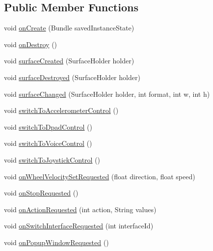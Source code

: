 \subsection*{Public Member Functions}
\begin{DoxyCompactItemize}
\item 
void \hyperlink{classcom_1_1cellbots_1_1directcontrol_1_1_cellbot_pet_activity_aa495c9cab7b25b9bc4ed212560003e57}{on\-Create} (Bundle saved\-Instance\-State)
\item 
void \hyperlink{classcom_1_1cellbots_1_1directcontrol_1_1_cellbot_pet_activity_aae26caa6558899d648deeeaeac2e83e2}{on\-Destroy} ()
\item 
void \hyperlink{classcom_1_1cellbots_1_1directcontrol_1_1_cellbot_pet_activity_a69d24e6f94e5bdd0bd550301b6feaf51}{surface\-Created} (Surface\-Holder holder)
\item 
void \hyperlink{classcom_1_1cellbots_1_1directcontrol_1_1_cellbot_pet_activity_ae9482d9a5c5b71018fca46571b3069be}{surface\-Destroyed} (Surface\-Holder holder)
\item 
void \hyperlink{classcom_1_1cellbots_1_1directcontrol_1_1_cellbot_pet_activity_a0362721b5720ba217305d411d5682419}{surface\-Changed} (Surface\-Holder holder, int format, int w, int h)
\item 
void \hyperlink{classcom_1_1cellbots_1_1directcontrol_1_1_cellbot_pet_activity_a590aae0cb7ac6de272a6dc159c75249d}{switch\-To\-Accelerometer\-Control} ()
\item 
void \hyperlink{classcom_1_1cellbots_1_1directcontrol_1_1_cellbot_pet_activity_a8bb7c255df7a54df85e3f73fa8611405}{switch\-To\-Dpad\-Control} ()
\item 
void \hyperlink{classcom_1_1cellbots_1_1directcontrol_1_1_cellbot_pet_activity_ad77f5722b9b596d0cd91590f784a1f1d}{switch\-To\-Voice\-Control} ()
\item 
void \hyperlink{classcom_1_1cellbots_1_1directcontrol_1_1_cellbot_pet_activity_a7d0afd1fe3e7f19fc360d81e767e1553}{switch\-To\-Joystick\-Control} ()
\item 
void \hyperlink{classcom_1_1cellbots_1_1directcontrol_1_1_cellbot_pet_activity_acb512b9a74e5b51189761c595ecf2c23}{on\-Wheel\-Velocity\-Set\-Requested} (float direction, float speed)
\item 
void \hyperlink{classcom_1_1cellbots_1_1directcontrol_1_1_cellbot_pet_activity_a71ecc6da4c0b7b764227ee051f1baffe}{on\-Stop\-Requested} ()
\item 
void \hyperlink{classcom_1_1cellbots_1_1directcontrol_1_1_cellbot_pet_activity_a74d38a79b194514502629984b408b5ad}{on\-Action\-Requested} (int action, String values)
\item 
void \hyperlink{classcom_1_1cellbots_1_1directcontrol_1_1_cellbot_pet_activity_ad494bfd91b52b5e2ed518866d41e2e48}{on\-Switch\-Interface\-Requested} (int interface\-Id)
\item 
void \hyperlink{classcom_1_1cellbots_1_1directcontrol_1_1_cellbot_pet_activity_a6069e1633e745226d6ab1be54be03a95}{on\-Popup\-Window\-Requested} ()
\end{DoxyCompactItemize}
